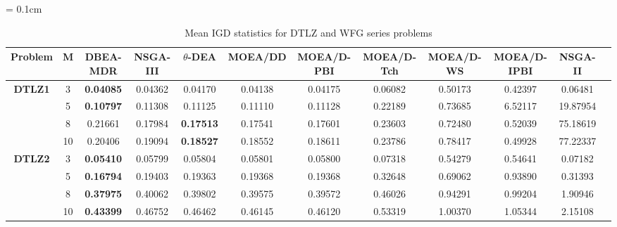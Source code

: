 \documentclass{sig-alternate}
\begin{document}
\begin{table}[!htb]\scriptsize
	\centering
	\renewcommand{\arraystretch}{0.9}
	\caption{Mean IGD statistics for DTLZ and WFG series problems}
	\label{tab:IGD}
	\tabcolsep = 0.1cm
	\begin{tabular}{|c|c|c|c|c|c|c|c|c|c|c|c|}
		\noalign{\smallskip}\hline
		\textbf{Problem}                & \textbf{M} & \textbf{DBEA-MDR} & \textbf{NSGA-III} & \textbf{$\theta$-DEA} & \textbf{MOEA/DD} & \textbf{MOEA/D-PBI} & \textbf{MOEA/D-Tch} & \textbf{MOEA/D-WS} & \textbf{MOEA/D-IPBI} & \textbf{NSGA-II} \\ \hline
		\multirow{4}{*}{\textbf{DTLZ1}} & 3          & \textbf{0.04085} & 0.04362           & 0.04170               & 0.04138          & 0.04175             & 0.06082             & 0.50173            & 0.42397              & 0.06481          \\ \cline{2-11} 
		& 5          & \textbf{0.10797} & 0.11308           & 0.11125               & 0.11110          & 0.11128             & 0.22189             & 0.73685            & 6.52117              & 19.87954         \\ \cline{2-11} 
		& 8          & 0.21661          & 0.17984           & \textbf{0.17513}      & 0.17541          & 0.17601             & 0.23603             & 0.72480            & 0.52039              & 75.18619         \\ \cline{2-11} 
		& 10         & 0.20406          & 0.19094           & \textbf{0.18527}      & 0.18552          & 0.18611             & 0.23786             & 0.78417            & 0.49928              & 77.22337         \\ \hline
		\multirow{4}{*}{\textbf{DTLZ2}} & 3          & \textbf{0.05410} & 0.05799           & 0.05804               & 0.05801          & 0.05800             & 0.07318             & 0.54279            & 0.54641              & 0.07182          \\ \cline{2-11} 
		& 5          & \textbf{0.16794} & 0.19403           & 0.19363               & 0.19368          & 0.19368             & 0.32648             & 0.69062            & 0.93890              & 0.31393          \\ \cline{2-11} 
		& 8          & \textbf{0.37975} & 0.40062           & 0.39802               & 0.39575          & 0.39572             & 0.46026             & 0.94291            & 0.99204              & 1.90946          \\ \cline{2-11} 
		& 10         & \textbf{0.43399} & 0.46752           & 0.46462               & 0.46145          & 0.46120             & 0.53319             & 1.00370            & 1.05344              & 2.15108          \\ \hline

\end{tabular}
\end{table}
\end{document}

